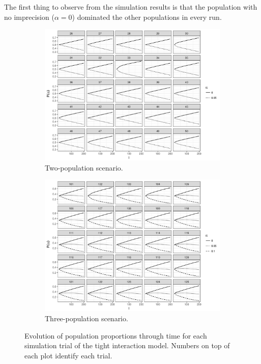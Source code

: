\documentclass[a4paper]{article}
\begin{document}
The first thing to observe from the simulation results is that the population with no imprecision ($\alpha = 0$) dominated the other populations in every run.
\begin{figure}
  \centering
  \begin{subfigure}[]{.9\textwidth}
    \includegraphics[width=\textwidth]{simulation/results/round-3/plots/proportion-cases-0-005-strong-square.png}
    \caption{Two-population scenario.}
    \label{fig:proportion-cases-two-tight-interaction}
  \end{subfigure}
  \hfill
  \begin{subfigure}[]{.9\textwidth}
    \includegraphics[width=\textwidth]{simulation/results/round-3/plots/proportion-cases-0-005-01-strong-square.png}
    \caption{Three-population scenario.}
    \label{fig:proportion-cases-three-tight-interaction}
  \end{subfigure}
  \caption{Evolution of population proportions through time for each simulation trial of the tight interaction model. Numbers on top of each plot identify each trial.}
  \label{fig:proportion-cases-tight-interaction}
\end{figure}
\end{document}
